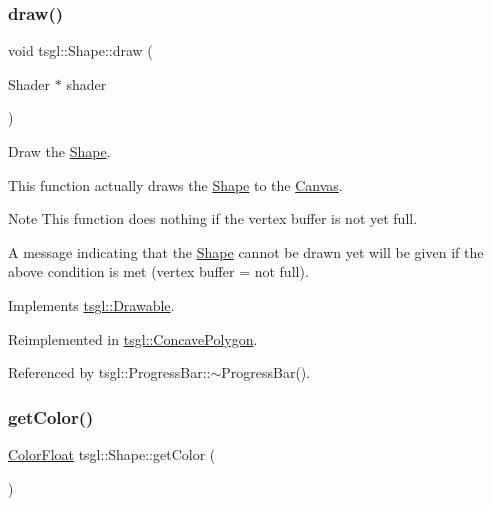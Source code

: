 \mbox{\label{classtsgl_1_1_shape_ae0905e73f1652d92cef9c7f2c38572f3}} 
\subsubsection{\texorpdfstring{draw()}{draw()}}
{\footnotesize\ttfamily void tsgl\+::\+Shape\+::draw (\begin{DoxyParamCaption}\item[{Shader $\ast$}]{shader }\end{DoxyParamCaption})\hspace{0.3cm}{\ttfamily [virtual]}}



Draw the \hyperlink{classtsgl_1_1_shape}{Shape}. 

This function actually draws the \hyperlink{classtsgl_1_1_shape}{Shape} to the \hyperlink{classtsgl_1_1_canvas}{Canvas}. \begin{DoxyNote}{Note}
This function does nothing if the vertex buffer is not yet full. 

A message indicating that the \hyperlink{classtsgl_1_1_shape}{Shape} cannot be drawn yet will be given if the above condition is met (vertex buffer = not full). 
\end{DoxyNote}


Implements \hyperlink{classtsgl_1_1_drawable}{tsgl\+::\+Drawable}.



Reimplemented in \hyperlink{classtsgl_1_1_concave_polygon_adf288a6b60873a7ae5e599f63868da82}{tsgl\+::\+Concave\+Polygon}.



Referenced by tsgl\+::\+Progress\+Bar\+::$\sim$\+Progress\+Bar().

\mbox{\label{classtsgl_1_1_shape_ab531d3d4ddca94ec14ec29f381eab838}} 
\subsubsection{\texorpdfstring{get\+Color()}{getColor()}}
{\footnotesize\ttfamily \hyperlink{structtsgl_1_1_color_float}{Color\+Float} tsgl\+::\+Shape\+::get\+Color (\begin{DoxyParamCaption}{ }\end{DoxyParamCaption})\hspace{0.3cm}{\ttfamily [virtual]}}




